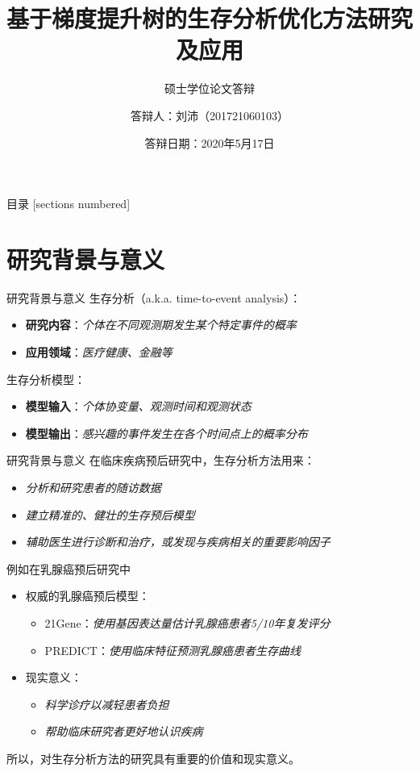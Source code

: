 \documentclass[10pt]{beamer}
\title{基于梯度提升树的生存分析优化方法研究及应用}
\subtitle{硕士学位论文答辩}
\date{答辩日期：2020年5月17日}
\author{答辩人：刘沛（201721060103）}
\institute{电子科技大学计算机科学与工程学院}
\begin{document}
\maketitle

\begin{frame}{目录}
  [sections numbered]
  \tableofcontents[hideallsubsections]
\end{frame}

\section{研究背景与意义}

\begin{frame}{研究背景与意义}
  生存分析（a.k.a. time-to-event analysis）：
  \begin{itemize}
    \item \textbf{研究内容}：\textit{个体在不同观测期发生某个特定事件的概率}
    \item \textbf{应用领域}：\textit{医疗健康、金融等}
  \end{itemize}
  生存分析模型：
  \begin{itemize}
    \item \textbf{模型输入}：\textit{个体协变量、观测时间和观测状态}
    \item \textbf{模型输出}：\textit{感兴趣的事件发生在各个时间点上的概率分布}
  \end{itemize}
\end{frame}

\begin{frame}{研究背景与意义}
  在临床疾病预后研究中，生存分析方法用来：
  \begin{itemize}
    \item \textit{分析和研究患者的随访数据}
    \item \textit{建立精准的、健壮的生存预后模型}
    \item \textit{辅助医生进行诊断和治疗，或发现与疾病相关的重要影响因子}
  \end{itemize}

  例如在乳腺癌预后研究中
  \begin{itemize}
    \item 权威的乳腺癌预后模型：
    \begin{itemize}
      \item 21Gene：\textit{使用基因表达量估计乳腺癌患者5/10年复发评分}
      \item PREDICT：\textit{使用临床特征预测乳腺癌患者生存曲线}
    \end{itemize}
    \item 现实意义：
    \begin{itemize}
      \item \textit{科学诊疗以减轻患者负担}
      \item \textit{帮助临床研究者更好地认识疾病}
    \end{itemize}
  \end{itemize}

  所以，对生存分析方法的研究具有重要的价值和现实意义。
\end{frame}
\end{document}
